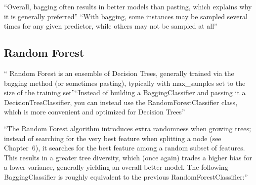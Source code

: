 \documentclass[12pt]{report}
\begin{document}


“Overall, bagging often results in better models than pasting, which explains why it is generally preferred”
“With bagging, some instances may be sampled several times for any given predictor, while others may not be sampled at all”



\subsection{Random Forest}
“ Random Forest is an ensemble of Decision Trees, generally trained via the bagging method (or sometimes pasting), typically with max_samples set to the size of the training set”“Instead of building a BaggingClassifier and passing it a DecisionTreeClassifier, you can instead use the RandomForestClassifier class, which is more convenient and optimized for Decision Trees”


“The Random Forest algorithm introduces extra randomness when growing trees; instead of searching for the very best feature when splitting a node (see Chapter 6), it searches for the best feature among a random subset of features. This results in a greater tree diversity, which (once again) trades a higher bias for a lower variance, generally yielding an overall better model. The following BaggingClassifier is roughly equivalent to the previous RandomForestClassifier:”
\end{document}
